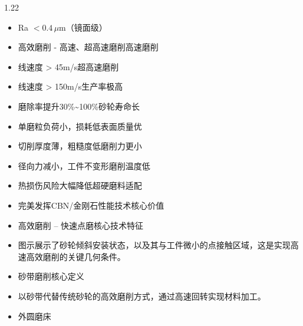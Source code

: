 \documentclass[12pt,a4paper]{article}
\begin{document}
\begin{spacing}{1.22}
\begin{itemize}[leftmargin=2.2em,label=--]
  \item Ra $<0.4\,\mu\text{m}$（镜面级）
  \item 高效磨削 - 高速、超高速磨削高速磨削
  \item 线速度 > 45m/s超高速磨削
  \item 线速度 > 150m/s生产率极高
  \item 磨除率提升30\%\textasciitilde{}100\%砂轮寿命长
  \item 单磨粒负荷小，损耗低表面质量优
  \item 切削厚度薄，粗糙度低磨削力更小
  \item 径向力减小，工件不变形磨削温度低
  \item 热损伤风险大幅降低超硬磨料适配
  \item 完美发挥CBN/金刚石性能技术核心价值
  \item 高效磨削 – 快速点磨核心技术特征
  \item 图示展示了砂轮倾斜安装状态，以及其与工件微小的点接触区域，这是实现高速高效磨削的关键几何条件。
  \item 砂带磨削核心定义
  \item 以砂带代替传统砂轮的高效磨削方式，通过高速回转实现材料加工。
  \item 外圆磨床
\end{itemize}


\end{spacing}
\end{document}
